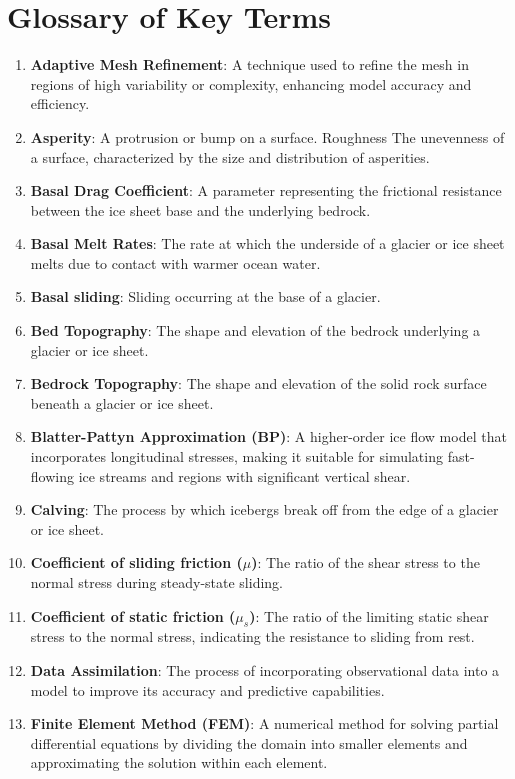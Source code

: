 \chapter{Glossary of Key Terms}\label{glossary}
\begin{enumerate}
\item \textbf{Adaptive Mesh Refinement}: A technique used to refine the mesh in regions of high variability or complexity, enhancing model accuracy and efficiency.
\item \textbf{Asperity}: A protrusion or bump on a surface. Roughness The unevenness of a surface, characterized by the size and distribution of asperities.
\item \textbf{Basal Drag Coefficient}: A parameter representing the frictional resistance between the ice sheet base and the underlying bedrock.
\item \textbf{Basal Melt Rates}: The rate at which the underside of a glacier or ice sheet melts due to contact with warmer ocean water.
\item \textbf{Basal sliding}: Sliding occurring at the base of a glacier.
\item \textbf{Bed Topography}: The shape and elevation of the bedrock underlying a glacier or ice sheet.
\item \textbf{Bedrock Topography}: The shape and elevation of the solid rock surface beneath a glacier or ice sheet.
\item \textbf{Blatter-Pattyn Approximation (BP)}: A higher-order ice flow model that incorporates longitudinal stresses, making it suitable for simulating fast-flowing ice streams and regions with significant vertical shear.
\item \textbf{Calving}: The process by which icebergs break off from the edge of a glacier or ice sheet.
\item \textbf{Coefficient of sliding friction ($\mu$)}: The ratio of the shear stress to the normal stress during steady-state sliding.
\item \textbf{Coefficient of static friction ($\mu_s$)}: The ratio of the limiting static shear stress to the normal stress, indicating the resistance to sliding from rest.
\item \textbf{Data Assimilation}: The process of incorporating observational data into a model to improve its accuracy and predictive capabilities.
\item \textbf{Finite Element Method (FEM)}: A numerical method for solving partial differential equations by dividing the domain into smaller elements and approximating the solution within each element.

\end{enumerate}
